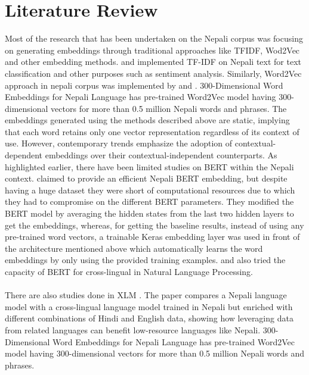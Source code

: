 \chapter{Literature Review}
\noindent
Most of the research that has been undertaken on the Nepali corpus was focusing on generating embeddings through traditional approaches like TFIDF, Wod2Vec and other embedding methods. \cite{Bhatta_Shrestha_Nepal_Pandey_Koirala_2020} \cite{Singh2019NepaliMT} \cite{shahi2018nepali} and \cite{ghosh2018class} implemented TF-IDF on Nepali text for text classification and other purposes such as sentiment analysis. Similarly, Word2Vec approach in nepali corpus was implemented by \cite{Bhatta_Shrestha_Nepal_Pandey_Koirala_2020} \cite{kaushal2016} and \cite{basnet2018improving}. 300-Dimensional Word Embeddings for Nepali Language \cite{300D} has pre-trained Word2Vec model having 300-dimensional vectors for more than 0.5 million Nepali words and phrases. The embeddings generated using the methods described above are static, implying that each word retains only one vector representation regardless of its context of use. However, contemporary trends emphasize the adoption of contextual-dependent embeddings over their contextual-independent counterparts. As highlighted earlier, there have been limited studies on BERT within the Nepali context. \cite{koirala-niraula-2021-npvec1} claimed to provide an efficient Nepali BERT embedding, but despite having a huge dataset they were short of computational resources due to which they had to compromise on the different BERT parameters. They modified the BERT model by averaging the hidden states from the last two hidden layers to get the embeddings, whereas, for getting the baseline results, instead of using any pre-trained word vectors, a trainable Keras embedding layer was used in front of the architecture mentioned above which automatically learns the word embeddings by only using the provided training examples. \cite{rajan_nepalibert_2021} and  \cite{milanmg_bert-nepali_2022} also tried the capacity of BERT for cross-lingual in Natural Language Processing. \\\\
There are also studies done in XLM \cite{NEURIPS2019_c04c19c2}. The paper compares a Nepali language model with a cross-lingual language model trained in Nepali but enriched with different combinations of Hindi and English data, showing how leveraging data from related languages can benefit low-resource languages like Nepali.
300-Dimensional Word Embeddings for Nepali Language \cite{300D} has pre-trained Word2Vec model having 300-dimensional vectors for more than 0.5 million Nepali words and phrases.
